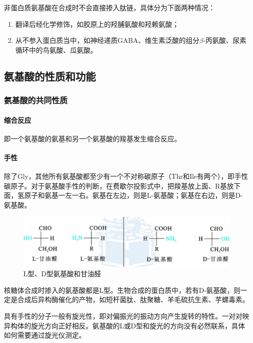 非蛋白质氨基酸在合成时不会直接掺入肽链，具体分为下面两种情况：
\begin{enumerate}
	\item 翻译后经化学修饰，如胶原上的羟脯氨酸和羟赖氨酸；
	\item 从不参入蛋白质当中，如神经递质GABA、维生素泛酸的组分$\beta$-丙氨酸、尿素循环中的鸟氨酸、瓜氨酸。
\end{enumerate}

\subsection{氨基酸的性质和功能}

\subsubsection{氨基酸的共同性质}

\paragraph{缩合反应}

即一个氨基酸的氨基和另一个氨基酸的羧基发生缩合反应。

\paragraph{手性}

除了Gly，其他所有氨基酸都至少有一个不对称碳原子（Thr和Ile有两个），即手性碳原子。对于氨基酸手性的判断，在费歇尔投影式中，把羧基放上面、R基放下面，氢原子和氨基一左一右。氨基在左边，则是L-氨基酸；氨基在右边，则是D-氨基酸。

\begin{figure}[htbp]
	\centering
	\includegraphics[width=0.8\linewidth]{Pics/L,D-aas}
	\caption{L型、D型氨基酸和甘油醛}
	\label{fig:ld-aas}
\end{figure}


核糖体合成时掺入的氨基酸都是L型。生物合成的蛋白质中，若有D-氨基酸，则一定是合成后异构酶催化的产物，如短杆菌肽、肽聚糖、羊毛硫抗生素、芋螺毒素。

具有手性的分子一般有旋光性，即对偏振光的振动方向产生旋转的特性。一对对映异构体的旋光方向正好相反。氨基酸的L或D型和旋光的方向没有必然联系，具体如何需要通过旋光仪测定。

